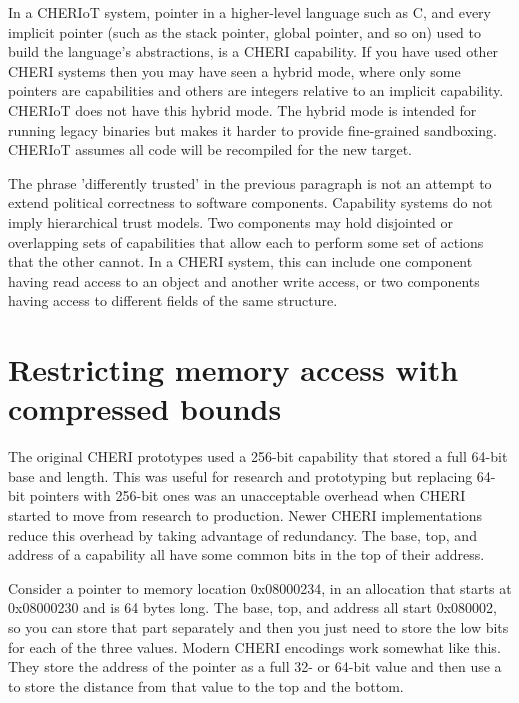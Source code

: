 \begin{note}
	In a CHERIoT system,  pointer in a higher-level language such as C, and every implicit pointer (such as the stack pointer, global pointer, and so on) used to build the language's abstractions, is a CHERI capability.
	If you have used other CHERI systems then you may have seen a hybrid mode, where only some pointers are capabilities and others are integers relative to an implicit capability.
	CHERIoT does not have this hybrid mode.
	The hybrid mode is intended for running legacy binaries but makes it harder to provide fine-grained sandboxing.
	CHERIoT assumes all code will be recompiled for the new target.
\end{note}

The phrase 'differently trusted' in the previous paragraph is not an attempt to extend political correctness to software components.
Capability systems do not imply hierarchical trust models.
Two components may hold disjointed or overlapping sets of capabilities that allow each to perform some set of actions that the other cannot.
In a CHERI system, this can include one component having read access to an object and another write access, or two components having access to different fields of the same structure.

\section{Restricting memory access with compressed bounds}

The original CHERI prototypes used a 256-bit capability that stored a full 64-bit base and length.
This was useful for research and prototyping but replacing 64-bit pointers with 256-bit ones was an unacceptable overhead when CHERI started to move from research to production.
Newer CHERI implementations reduce this overhead by taking advantage of redundancy.
The base, top, and address of a capability all have some common bits in the top of their address.


Consider a pointer to memory location 0x08000234, in an allocation that starts at 0x08000230 and is 64 bytes long.
The base, top, and address all start 0x080002, so you can store that part separately and then you just need to store the low bits for each of the three values.
Modern CHERI encodings work somewhat like this.
They store the address of the pointer as a full 32- or 64-bit value and then use a  to store the distance from that value to the top and the bottom.

